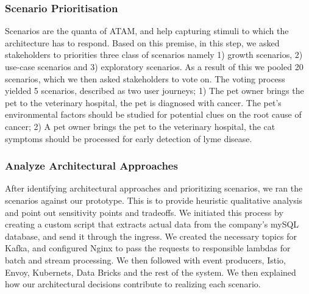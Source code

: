 \documentclass[conference]{IEEEtran}
\begin{document}






\subsubsection{Scenario Prioritisation}

Scenarios are the quanta of ATAM, and help capturing stimuli to which the architecture has to respond. Based on this premise, in this step, we asked stakeholders to priorities three class of scenarios namely 1) growth scenarios, 2) use-case scenarios and 3) exploratory scenarios. As a result of this we pooled 20 scenarios, which we then asked stakeholders to vote on. The voting process yielded 5 scenarios, described as two user journeys; 1) The pet owner brings the pet to the veterinary hospital, the pet is diagnosed with cancer. The pet's environmental factors should be studied for potential clues on the root cause of cancer; 2) A pet owner brings the pet to the veterinary hospital, the cat symptoms should be processed for early detection of lyme disease. 



\subsubsection{Analyze Architectural Approaches}

After identifying architectural approaches and prioritizing scenarios, we ran the scenarios against our prototype. This is to provide heuristic qualitative analysis and point out sensitivity points and tradeoffs. We initiated this process by creating a custom script that extracts actual data from the company's mySQL database, and send it through the ingress. We created the necessary topics for Kafka, and configured Nginx to pass the requests to responsible lambdas for batch and stream processing. We then followed with event producers, Istio, Envoy, Kubernets, Data Bricks and the rest of the system. We then explained how our architectural decisions contribute to realizing each scenario.
\end{document}
